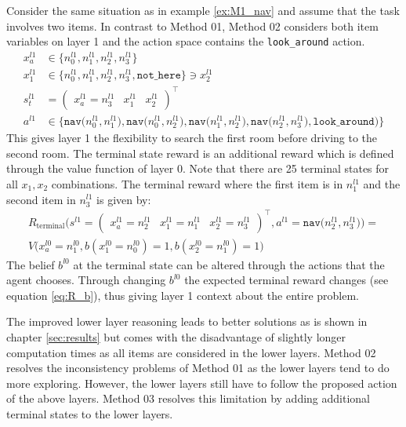 \begin{example}\label{ex:M2_nav}
Consider the same situation as in example \ref{ex:M1_nav} and assume that the task involves two items. In contrast to Method 01, Method 02 considers both item variables on layer 1 and the action space contains the \texttt{look\_around} action.
\begin{equation}
    \begin{aligned}
         x_a^{l1} &\in \big\{n_0^{l1}, n_1^{l1}, n_2^{l1}, n_3^{l1}  \big\} \\
         x_1^{l1} &\in \big\{n_0^{l1}, n_1^{l1}, n_2^{l1}, n_3^{l1}, \texttt{not\_here} \big\} \ni x_2^{l1}\\
        s_t^{l1} &= \begin{pmatrix}x_a^{l1}=n_3^{l1} & x_1^{l1} & x_2^{l1} \end{pmatrix}^\intercal\\
        a^{l1} &\in \big\{\texttt{nav($n_0^{l1}, n_1^{l1}$)}, \texttt{nav($n_0^{l1}, n_2^{l1}$)}, \texttt{nav($n_1^{l1}, n_2^{l1}$)},\texttt{nav($n_2^{l1}, n_3^{l1}$)}, \texttt{look\_around)} \big\}
    \end{aligned}
\end{equation}
This gives layer 1 the flexibility to search the first room before driving to the second room. The terminal state reward is an additional reward which is defined through the value function of layer 0. Note that there are 25 terminal states for all $x_1, x_2$ combinations. The terminal reward where the first item is in $n_1^{l1}$ and the second item in $n_3^{l1}$ is given by:  
\begin{multline}
    R_\text{terminal}\big(s^{l1}=\begin{pmatrix} x_a^{l1}=n_2^{l1} & x_1^{l1} = n_1^{l1} & x_2^{l1} = n_3^{l1} \end{pmatrix}^\intercal, a^{l1}=\texttt{nav($n_2^{l1},n_3^{l1}$)}\big)=\\
    V\big( x_a^{l0}=n_1^{l0}, b(x_1^{l0}=n_0^{l0})=1, b(x_2^{l0}=n_1^{l0})=1 \big)
\end{multline}
The belief $b^{l0}$ at the terminal state can be altered through the actions that the agent chooses. Through changing $b^{l0}$ the expected terminal reward changes (see equation \ref{eq:R_b}), thus giving layer 1 context about the entire problem. 
\demo
\end{example}
The improved lower layer reasoning leads to better solutions as is shown in chapter \ref{sec:results} but comes with the disadvantage of slightly longer computation times as all items are considered in the lower layers. Method 02 resolves the inconsistency problems of Method 01 as the lower layers tend to do more exploring. However, the lower layers still have to follow the proposed action of the above layers. Method 03 resolves this limitation by adding additional terminal states to the lower layers.
